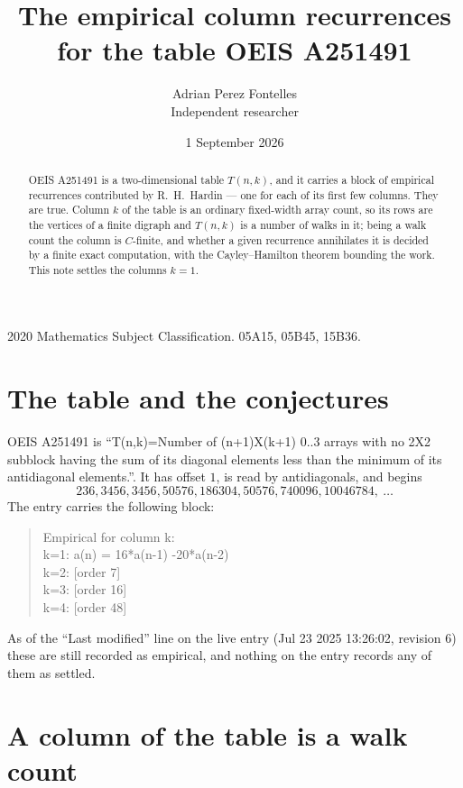 \documentclass[11pt,a4paper]{article}
\title{The empirical column recurrences for the table OEIS A251491}
\author{Adrian Perez Fontelles\\ \small Independent researcher}
\date{1 September 2026}
\theoremstyle{plain}
\theoremstyle{definition}
\begin{document}
\maketitle

\begin{abstract}
OEIS A251491 is a two-dimensional table $T(n,k)$, and it carries a block of empirical
recurrences contributed by R.~H.~Hardin --- one for each of its first few columns. They are
true. Column $k$ of the table is an ordinary fixed-width array count, so its rows are the
vertices of a finite digraph and $T(n,k)$ is a number of walks in it; being a walk count the
column is $C$-finite, and whether a given recurrence annihilates it is decided by a finite
exact computation, with the Cayley--Hamilton theorem bounding the work. This note settles the columns $k=1$.
\end{abstract}

\noindent\small 2020 Mathematics Subject Classification. 05A15, 05B45, 15B36.\normalsize

\section{The table and the conjectures}

OEIS A251491 is ``T(n,k)=Number of (n+1)X(k+1) 0..3 arrays with no 2X2 subblock having the sum of its diagonal elements less than the minimum of its antidiagonal elements.''. It has offset $1$, is
read by antidiagonals, and begins
\[
236, 3456, 3456, 50576, 186304, 50576, 740096, 10046784,\ \dots
\]
The entry carries the following block:
\begin{quote}\small
Empirical for column k:\\
k=1: a(n) = 16*a(n-1) -20*a(n-2)\\
k=2: [order 7]\\
k=3: [order 16]\\
k=4: [order 48]\\
\end{quote}
As of the ``Last modified'' line on the live entry (Jul 23 2025 13:26:02, revision 6) these are still
recorded as empirical, and nothing on the entry records any of them as settled.

\section{A column of the table is a walk count}
\end{document}

